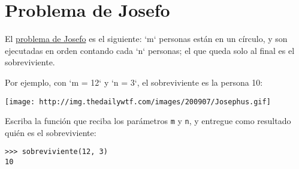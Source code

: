 \section{Problema de Josefo}

El
\href{http://es.wikipedia.org/wiki/Problema\_de\_Flavio\_Josefo}{problema
de Josefo} es el siguiente: `m` personas están en un círculo, y son
ejecutadas en orden contando cada `n` personas; el que queda solo al
final es el sobreviviente.

Por ejemplo, con `m = 12` y `n = 3`, el sobreviviente es la persona 10:

\texttt{[image: http://img.thedailywtf.com/images/200907/Josephus.gif]}

Escriba la función que reciba los parámetros \lstinline!m! y
\lstinline!n!, y entregue como resultado quién es el sobreviviente:

\begin{lstlisting}
>>> sobreviviente(12, 3)
10
\end{lstlisting}

